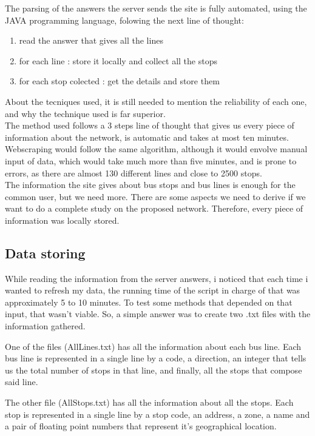 \documentclass[12pt]{article}
\begin{document}
\begin{multicols}{2}
The parsing of the answers the server sends the site is fully automated, using the JAVA programming language, folowing the next line of thought:

\begin{enumerate}
\item read the answer that gives all the lines
\item for each line : store it locally and collect all the stops
\item for each stop colected : get the details and store them
\end{enumerate}

About the tecniques used, it is still needed to mention the reliability of each one, and why the technique used is far superior.\\
	The method used follows a 3 steps line of thought that gives us every piece of information about the network, is automatic and takes at most ten minutes.\\
	Webscraping would follow the same algorithm, although it would envolve manual input of data, which would take much more than five minutes, and is prone to errors, as there are almost 130 different lines and close to 2500 stops.\\
	
The information the site gives about bus stops and bus lines is enough for the common user, but we need more. There are some aspects we need to derive if we want to do a complete study on the proposed network. Therefore, every piece of information was locally stored.

\subsection{Data storing}
While reading the information from the server answers, i noticed that each time i wanted to refresh my data, the running time of the script in charge of that was approximately 5 to 10 minutes. To test some methods that depended on that input, that wasn't viable. 
So, a simple answer was to create two .txt files with the information gathered.

One of the files (AllLines.txt) has all the information about each bus line.
Each bus line is represented in a single line by a code, a direction, an integer that tells us the total number of stops in that line, and finally, all the stops that compose said line.

The other file (AllStops.txt) has all the information about all the stops.
Each stop is represented in a single line by a stop code, an address, a zone, a name and a pair of floating point numbers that represent it's geographical location. 


\end{multicols}
\end{document}
